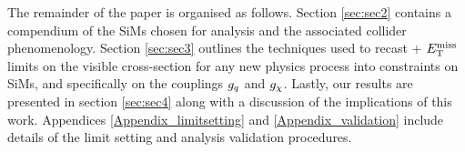 The remainder of the paper is organised as follows. Section \ref{sec:sec2} contains a compendium of the SiMs chosen for analysis and the associated collider phenomenology. Section \ref{sec:sec3} outlines the techniques used to recast \monoX + $E_{\mathrm{T}}^{\mathrm{miss}}$ limits on the visible cross-section for any new physics process into constraints on SiMs, and specifically on the couplings $g_q$ and $g_{\chi}$. Lastly, our results are presented in section \ref{sec:sec4} along with a discussion of the implications of this work. Appendices \ref{Appendix_limitsetting} and \ref{Appendix_validation} include  details of the limit setting and analysis validation procedures.
